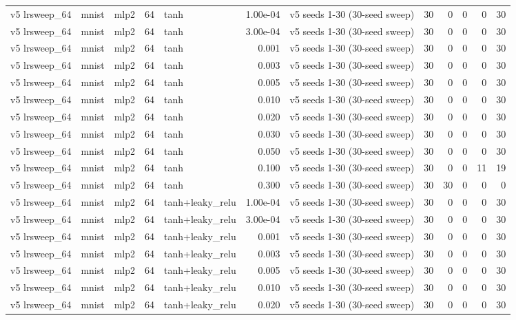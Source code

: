 \begin{table}[htbp]
{\begin{tabular}{@{}lllrlrlrrrrr@{}}
v5 lrsweep\_64 & mnist & mlp2 & 64 & tanh & 1.00e-04 & v5 seeds 1-30 (30-seed sweep) & 30 & 0 & 0 & 0 & 30 \\
v5 lrsweep\_64 & mnist & mlp2 & 64 & tanh & 3.00e-04 & v5 seeds 1-30 (30-seed sweep) & 30 & 0 & 0 & 0 & 30 \\
v5 lrsweep\_64 & mnist & mlp2 & 64 & tanh & 0.001 & v5 seeds 1-30 (30-seed sweep) & 30 & 0 & 0 & 0 & 30 \\
v5 lrsweep\_64 & mnist & mlp2 & 64 & tanh & 0.003 & v5 seeds 1-30 (30-seed sweep) & 30 & 0 & 0 & 0 & 30 \\
v5 lrsweep\_64 & mnist & mlp2 & 64 & tanh & 0.005 & v5 seeds 1-30 (30-seed sweep) & 30 & 0 & 0 & 0 & 30 \\
v5 lrsweep\_64 & mnist & mlp2 & 64 & tanh & 0.010 & v5 seeds 1-30 (30-seed sweep) & 30 & 0 & 0 & 0 & 30 \\
v5 lrsweep\_64 & mnist & mlp2 & 64 & tanh & 0.020 & v5 seeds 1-30 (30-seed sweep) & 30 & 0 & 0 & 0 & 30 \\
v5 lrsweep\_64 & mnist & mlp2 & 64 & tanh & 0.030 & v5 seeds 1-30 (30-seed sweep) & 30 & 0 & 0 & 0 & 30 \\
v5 lrsweep\_64 & mnist & mlp2 & 64 & tanh & 0.050 & v5 seeds 1-30 (30-seed sweep) & 30 & 0 & 0 & 0 & 30 \\
v5 lrsweep\_64 & mnist & mlp2 & 64 & tanh & 0.100 & v5 seeds 1-30 (30-seed sweep) & 30 & 0 & 0 & 11 & 19 \\
v5 lrsweep\_64 & mnist & mlp2 & 64 & tanh & 0.300 & v5 seeds 1-30 (30-seed sweep) & 30 & 30 & 0 & 0 & 0 \\
v5 lrsweep\_64 & mnist & mlp2 & 64 & tanh+leaky\_relu & 1.00e-04 & v5 seeds 1-30 (30-seed sweep) & 30 & 0 & 0 & 0 & 30 \\
v5 lrsweep\_64 & mnist & mlp2 & 64 & tanh+leaky\_relu & 3.00e-04 & v5 seeds 1-30 (30-seed sweep) & 30 & 0 & 0 & 0 & 30 \\
v5 lrsweep\_64 & mnist & mlp2 & 64 & tanh+leaky\_relu & 0.001 & v5 seeds 1-30 (30-seed sweep) & 30 & 0 & 0 & 0 & 30 \\
v5 lrsweep\_64 & mnist & mlp2 & 64 & tanh+leaky\_relu & 0.003 & v5 seeds 1-30 (30-seed sweep) & 30 & 0 & 0 & 0 & 30 \\
v5 lrsweep\_64 & mnist & mlp2 & 64 & tanh+leaky\_relu & 0.005 & v5 seeds 1-30 (30-seed sweep) & 30 & 0 & 0 & 0 & 30 \\
v5 lrsweep\_64 & mnist & mlp2 & 64 & tanh+leaky\_relu & 0.010 & v5 seeds 1-30 (30-seed sweep) & 30 & 0 & 0 & 0 & 30 \\
v5 lrsweep\_64 & mnist & mlp2 & 64 & tanh+leaky\_relu & 0.020 & v5 seeds 1-30 (30-seed sweep) & 30 & 0 & 0 & 0 & 30 \\

\end{tabular}}
\end{table}
